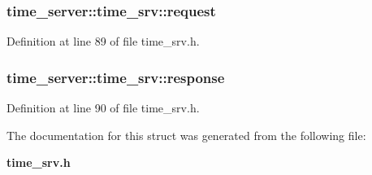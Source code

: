 \subsubsection[{request}]{ {\bf time\-\_\-server\-::time\-\_\-srv\-::request}}\label{structtime__server_1_1time__srv_a1491c11e38d4f6c1890929703a517122}


\-Definition at line 89 of file time\-\_\-srv.\-h.

\subsubsection[{response}]{ {\bf time\-\_\-server\-::time\-\_\-srv\-::response}}\label{structtime__server_1_1time__srv_af5cc708c324265f9e174089bab4fa213}


\-Definition at line 90 of file time\-\_\-srv.\-h.



\-The documentation for this struct was generated from the following file\-:\begin{DoxyCompactItemize}
\item 
{\bf time\-\_\-srv.\-h}\end{DoxyCompactItemize}
